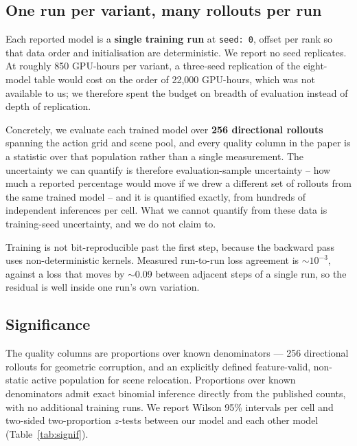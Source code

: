 \subsection{One run per variant, many rollouts per run}

Each reported model is a \textbf{single training run} at \texttt{seed:\ 0},
offset per rank so that data order and initialisation are deterministic. We
report no seed replicates. At roughly 850 GPU-hours per variant, a three-seed
replication of the eight-model table would cost on the order of 22{,}000
GPU-hours, which was not available to us; we therefore spent the budget on
breadth of evaluation instead of depth of replication.

Concretely, we evaluate each trained model over \textbf{256 directional
rollouts} spanning the action grid and scene pool, and every quality column in
the paper is a statistic over that population rather than a single measurement.
The uncertainty we can quantify is therefore evaluation-sample uncertainty --
how much a reported percentage would move if we drew a different set of
rollouts from the same trained model -- and it is quantified exactly, from
hundreds of independent inferences per cell. What we cannot quantify from these
data is training-seed uncertainty, and we do not claim to.

Training is not bit-reproducible past the first step, because the backward pass
uses non-deterministic kernels. Measured run-to-run loss agreement is
$\sim$$10^{-3}$, against a loss that moves by $\sim$0.09 between adjacent steps
of a single run, so the residual is well inside one run's own variation.

\subsection{Significance}

The quality columns are proportions over known denominators --- 256 directional
rollouts for geometric corruption, and an explicitly defined feature-valid,
non-static active population for scene relocation. Proportions over known
denominators admit exact binomial inference directly from the published counts,
with no additional training runs. We report Wilson 95\% intervals per cell and
two-sided two-proportion $z$-tests between our model and each other model
(Table~\ref{tab:signif}).

